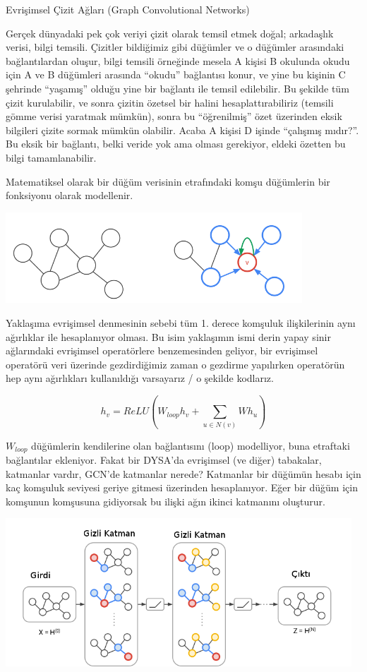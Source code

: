 \documentclass[12pt,fleqn]{article}\usepackage{../../common}
\begin{document}
Evrişimsel Çizit Ağları (Graph Convolutional Networks)

Gerçek dünyadaki pek çok veriyi çizit olarak temsil etmek doğal; arkadaşlık
verisi, bilgi temsili. Çizitler bildiğimiz gibi düğümler ve o düğümler
arasındaki bağlantılardan oluşur, bilgi temsili örneğinde mesela A kişisi B
okulunda okudu için A ve B düğümleri arasında ``okudu'' bağlantısı konur,
ve yine bu kişinin C şehrinde ``yaşamış'' olduğu yine bir bağlantı ile
temsil edilebilir. Bu şekilde tüm çizit kurulabilir, ve sonra çizitin
özetsel bir halini hesaplattırabiliriz (temsili gömme verisi yaratmak
mümkün), sonra bu ``öğrenilmiş'' özet üzerinden eksik bilgileri çizite
sormak mümkün olabilir. Acaba A kişisi D işinde ``çalışmış mıdır?''. Bu
eksik bir bağlantı, belki veride yok ama olması gerekiyor, eldeki özetten
bu bilgi tamamlanabilir. 

Matematiksel olarak bir düğüm verisinin etrafındaki komşu düğümlerin bir
fonksiyonu olarak modellenir.

\includegraphics[width=30em]{graphconv_02.png}

Yaklaşıma evrişimsel denmesinin sebebi tüm 1. derece komşuluk ilişkilerinin
aynı ağırlıklar ile hesaplanıyor olması. Bu isim yaklaşımın ismi derin
yapay sinir ağlarındaki evrişimsel operatörlere benzemesinden geliyor, bir
evrişimsel operatörü veri üzerinde gezdirdiğimiz zaman o gezdirme
yapılırken operatörün hep aynı ağırlıkları kullanıldığı varsayarız / o
şekilde kodlarız.

$$ h_v = ReLU(W_{loop}h_v + \sum_{u \in N(v)} W h_u ) $$

$W_{loop}$ düğümlerin kendilerine olan bağlantısını (loop) modelliyor, buna
etraftaki bağlantılar ekleniyor. Fakat bir DYSA'da evrişimsel (ve diğer)
tabakalar, katmanlar vardır, GCN'de katmanlar nerede? Katmanlar bir düğümün
hesabı için kaç komşuluk seviyesi geriye gitmesi üzerinden
hesaplanıyor. Eğer bir düğüm için komşunun komşusuna gidiyorsak bu ilişki
ağın ikinci katmanını oluşturur.

\includegraphics[width=35em]{graphconv_01.png}
\end{document}
